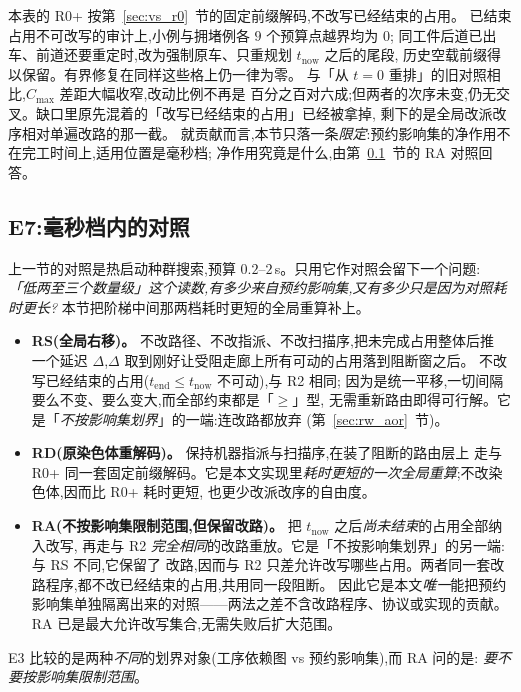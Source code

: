 \documentclass[manuscript,screen,review]{acmart}
\newcommand{\RzeroPastLo}{0}
\begin{document}
本表的 R0+ 按第~\ref{sec:vs_r0}~节的固定前缀解码,不改写已经结束的占用。
已结束占用不可改写的审计上,小例与拥堵例各 \(9\) 个预算点越界均为 \(\RzeroPastLo\);
同工件后道已出车、前道还要重定时,改为强制原车、只重规划 \(t_{\mathrm{now}}\) 之后的尾段,
历史空载前缀得以保留。有界修复在同样这些格上仍一律为零。
与「从 \(t=0\) 重排」的旧对照相比,\(C_{\max}\) 差距大幅收窄,改动比例不再是
百分之百对六成;但两者的次序未变,仍无交叉。缺口里原先混着的「改写已经结束的占用」已经被拿掉,
剩下的是全局改派改序相对单遍改路的那一截。
就贡献而言,本节只落一条\emph{限定}:预约影响集的净作用不在完工时间上,适用位置是毫秒档;
净作用究竟是什么,由第~\ref{sec:cheap}~节的 RA 对照回答。

\subsection{E7:毫秒档内的对照}
\label{sec:cheap}

上一节的对照是热启动种群搜索,预算 \(0.2\)--\(2\)\,s。只用它作对照会留下一个问题:
\emph{「低两至三个数量级」这个读数,有多少来自预约影响集,又有多少只是因为对照耗时更长?}
本节把阶梯中间那两档耗时更短的全局重算补上。

\begin{itemize}[leftmargin=1.5em,itemsep=0.25em]
\item \textbf{RS(全局右移)。} 不改路径、不改指派、不改扫描序,把未完成占用整体后推
一个延迟 \(\Delta\),\(\Delta\) 取到刚好让受阻走廊上所有可动的占用落到阻断窗之后。
不改写已经结束的占用(\(t_{\mathrm{end}}\le t_{\mathrm{now}}\) 不可动),与 R2 相同;
因为是统一平移,一切间隔要么不变、要么变大,而全部约束都是「\(\ge\)」型,
无需重新路由即得可行解。它是「\emph{不按影响集划界}」的一端:连改路都放弃
(第~\ref{sec:rw_aor}~节)。
\item \textbf{RD(原染色体重解码)。} 保持机器指派与扫描序,在装了阻断的路由层上
走与 R0+ 同一套固定前缀解码。它是本文实现里\emph{耗时更短的一次全局重算};不改染色体,因而比 R0+ 耗时更短,
也更少改派改序的自由度。
\item \textbf{RA(不按影响集限制范围,但保留改路)。} 把 \(t_{\mathrm{now}}\) 之后\emph{尚未结束}的占用全部纳入改写,
再走与 R2 \emph{完全相同}的改路重放。它是「不按影响集划界」的另一端:与 RS 不同,它保留了
改路,因而与 R2 只差允许改写哪些占用。两者同一套改路程序,都不改已经结束的占用,共用同一段阻断。
因此它是本文\emph{唯一}能把预约影响集单独隔离出来的对照——两法之差不含改路程序、协议或实现的贡献。
RA 已是最大允许改写集合,无需失败后扩大范围。
\end{itemize}

E3 比较的是两种\emph{不同}的划界对象(工序依赖图 vs 预约影响集),而 RA 问的是:
\emph{要不要按影响集限制范围}。
\end{document}
